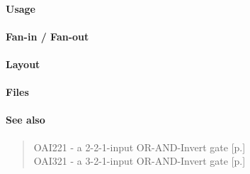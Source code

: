 \paragraph{Usage}

\paragraph{Fan-in / Fan-out}

\paragraph{Layout}

\paragraph{Files}

\paragraph{See also}
\begin{quote}
    OAI221 - a 2-2-1-input OR-AND-Invert gate [p.\pageref{OAI221}] \\
    OAI321 - a 3-2-1-input OR-AND-Invert gate [p.\pageref{OAI321}]
\end{quote}
